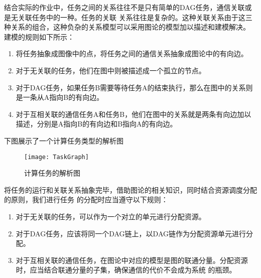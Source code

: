 结合实际的作业中，任务之间的关系往往不是只有简单的DAG任务，通信关联或是无关联任务中的一种。任务的关联
关系往往是复杂的。这种关联关系由于这三种关系的组合，这种负杂的关系模型可以采用图论的模型加以描述和建模解决。
建模的规则如下所示：
\begin{enumerate}
\item 将任务抽象成图像中的点，将任务之间的通信关系抽象成图论中的有向边。
\item 对于无关联的任务，他们在图中则被描述成一个孤立的节点。
\item 对于DAG任务，如果任务B需要等待任务A的结束执行，那么在图中的关系则是一条从A指向B的有向边。
\item 对于互相关联的通信任务A和任务B，他们在图中的关系就是两条有向边加以描述，分别是A指向B的有向边和B指向A的有向边。
\end{enumerate}
下图展示了一个计算任务类型的解析图
\begin{figure}[htbp]
\centering\texttt{[image: TaskGraph]}
\caption{计算任务的解析图}\label{fig:CBTaskGraph}
\end{figure}
将任务的运行和关联关系抽象完毕，借助图论的相关知识，同时结合资源调度分配的原则，我们进行任务
的分配时应当遵守以下规则：
\begin{enumerate}
\item 对于无关联的任务，可以作为一个对立的单元进行分配资源。
\item 对于DAG任务，应该将同一个DAG链上，以DAG链作为分配资源单元进行分配。
\item 对于互相关联的通信任务，在图论中对应的模型是图的联通分量。分配资源时，应当结合联通分量的子集，确保通信的代价不会成为系统
的瓶颈。
\end{enumerate}


